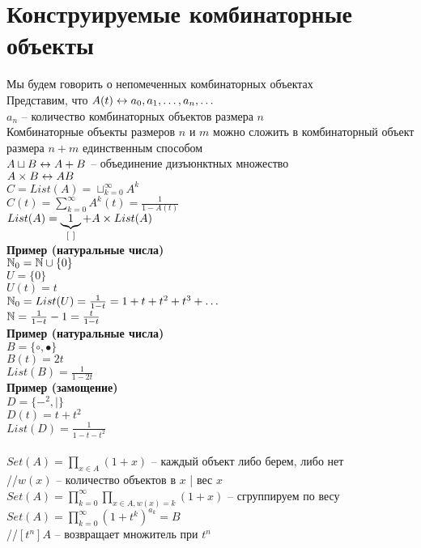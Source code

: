 \documentclass[12pt]{article}
\begin{document}
\section{Конструируемые комбинаторные объекты}
Мы будем говорить о непомеченных комбинаторных объектах\\
Представим, что $A(t) \lrto a_0, a_1, \ldots, a_n, \ldots$\\
$a_n$ -- количество комбинаторных объектов размера $n$\\
Комбинаторные объекты размеров $n$ и $m$ можно сложить в комбинаторный объект размера $n+m$ единственным способом\\
$A\sqcup B \lrto A + B$ -- объединение дизъюнктных множество\\
$A \times B \lrto AB$\\
$C = List(A) = \sqcup_{k=0}^\infty A^k$\\
$C(t) = \sum_{k=0}^\infty A^k(t) = \frac{1}{1-A(t)}$\\
$List(A) = \ub{[\ ]}1 + A\times List(A)$\\
\textbf{Пример (натуральные числа)}\\
$\Nset_0 = \Nset \cup \{0\}$\\
$U = \{0\}$\\
$U(t) = t$\\
$\Nset_0 = List(U) = \frac{1}{1-t} = 1 + t + t^2 + t^3 + \ldots$\\
$\Nset = \frac{1}{1-t} - 1 = \frac{t}{1-t}$\\
\textbf{Пример (натуральные числа)}\\
$B=\{\circ, \bullet\}$\\
$B(t) = 2t$\\
$List(B) = \frac{1}{1-2t}$\\
\textbf{Пример (замощение)}\\
$D = \{-^2, \text{|}\}$\\
$D(t) = t + t^2$\\
$List(D) = \frac{1}{1-t-t^2}$\\\\
$Set(A) = \prod_{x\in A} (1+x)$ -- каждый объект либо берем, либо нет\\
//$w(x)$ -- количество объектов в $x$ | вес $x$\\
$Set(A) = \prod_{k=0}^\infty \prod_{x\in A, w(x)=k}(1+x)$ -- сгруппируем по весу\\
$Set(A) = \prod_{k=0}^\infty (1+t^k)^{a_k} = B$\\
//$[t^n]A$ -- возвращает множитель при $t^n$\\
\end{document}
